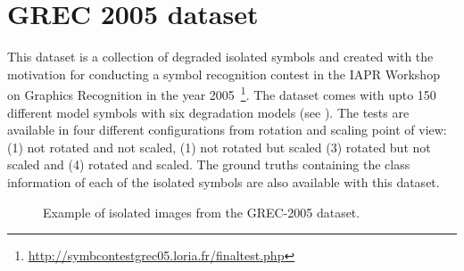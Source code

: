 \section{GREC 2005 dataset}
\label{sec:datasets:grec}
This dataset is a collection of degraded isolated symbols and created with the motivation for conducting a symbol recognition contest in the IAPR Workshop on Graphics Recognition in the year 2005~\cite{Dosch2006}\footnote{\url{http://symbcontestgrec05.loria.fr/finaltest.php}}. The dataset comes with upto 150 different model symbols with six degradation models (see ). The tests are available in four different configurations from rotation and scaling point of view: (1) not rotated and not scaled, (1) not rotated but scaled (3) rotated but not scaled and (4) rotated and scaled. The ground truths containing the class information of each of the isolated symbols are also available with this dataset.
\begin{figure}[h!]
\begin{center}
\hspace{0.5mm}
\hspace{0.5mm}
\hspace{0.5mm}
\hspace{0.5mm}
\hspace{0.5mm}
\end{center}
\caption{Example of isolated images from the GREC-2005 dataset.}
\label{fig:datasets:grec}
\end{figure}

